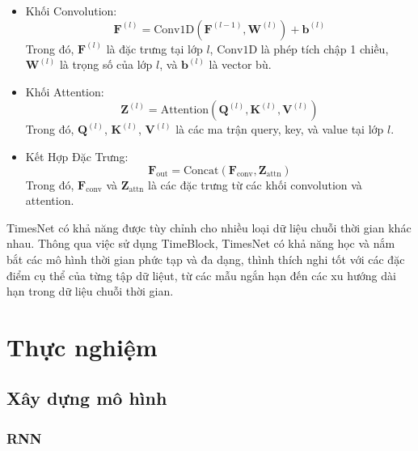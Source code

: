\documentclass[conference]{IEEEtran}
\begin{document}
	\begin{itemize}
		\item Khối Convolution:
		\begin{equation}
			\mathbf{F}^{(l)} = \text{Conv1D}(\mathbf{F}^{(l-1)}, \mathbf{W}^{(l)}) + \mathbf{b}^{(l)}
		\end{equation}
		Trong đó, $\mathbf{F}^{(l)}$ là đặc trưng tại lớp $l$, $\text{Conv1D}$ là phép tích chập 1 chiều, $\mathbf{W}^{(l)}$ là trọng số của lớp $l$, và $\mathbf{b}^{(l)}$ là vector bù.
		\item Khối Attention:
		\begin{equation}
			\mathbf{Z}^{(l)} = \text{Attention}(\mathbf{Q}^{(l)}, \mathbf{K}^{(l)}, \mathbf{V}^{(l)})
		\end{equation}
		Trong đó, $\mathbf{Q}^{(l)}$, $\mathbf{K}^{(l)}$, $\mathbf{V}^{(l)}$ là các ma trận query, key, và value tại lớp $l$.
		\item Kết Hợp Đặc Trưng:
		\begin{equation}
			\mathbf{F}_{\text{out}} = \text{Concat}(\mathbf{F}_{\text{conv}}, \mathbf{Z}_{\text{attn}})
		\end{equation}
		Trong đó, $\mathbf{F}_{\text{conv}}$ và $\mathbf{Z}_{\text{attn}}$ là các đặc trưng từ các khối convolution và attention.
	\end{itemize}
	TimesNet có khả năng được tùy chỉnh cho nhiều loại dữ liệu chuỗi thời gian khác nhau.
	Thông qua việc sử dụng TimeBlock, TimesNet có khả năng học và nắm bắt các mô hình thời gian phức tạp và đa dạng, thình thích nghi tốt với các đặc điểm cụ thể của từng tập dữ liệut, từ các mẫu ngắn hạn đến các xu hướng dài hạn trong dữ liệu chuỗi thời gian.
	\section{Thực nghiệm}
	
	\subsection{Xây dựng mô hình}
	
	\subsubsection{RNN}
	
\end{document}
